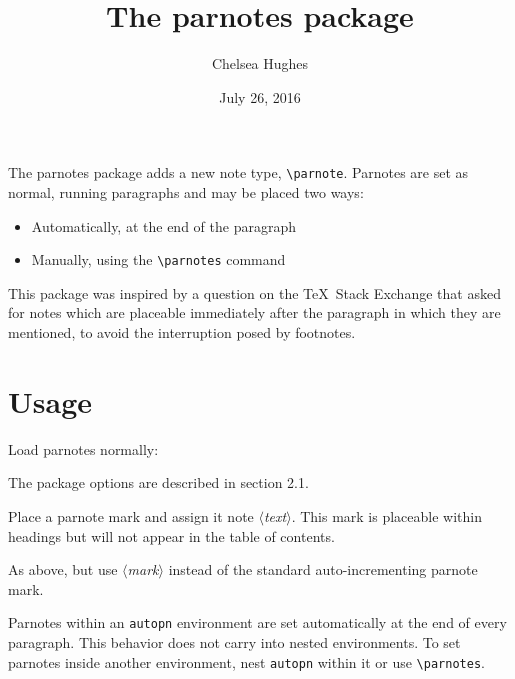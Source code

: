 \documentclass[10pt]{article}
\title{The \textsf{parnotes} package\parnote{This is rev.~2, last modified 7/26/2016.}}
\author{Chelsea Hughes\parnote{See \texttt{parnotes.sty} for copyright and contact details.}}
\date{July 26, 2016}
\begin{document}
\maketitle
\parnotes
The \textsf{parnotes} package adds a new note type, \verb+\parnote+. Parnotes are set as normal, running paragraphs and may be placed two ways:
\begin{itemize}
\item Automatically, at the end of the paragraph
\item Manually, using the \verb+\parnotes+ command
\end{itemize}
This package was inspired by a question on the \TeX\ Stack Exchange that asked for notes
which are placeable immediately after the paragraph in which they are mentioned, to avoid
the interruption posed by footnotes.

\parnotes
\bigskip
\section{Usage}
Load parnotes normally:

\medskip{}

\medskip\noindent The package options are described in section 2.1.

\medskip{}

\medskip\noindent Place a parnote mark and assign it note $\langle$\textit{text}$\rangle$. This mark is placeable within headings but will not appear in the table of contents.

\medskip{}

\medskip\noindent As above, but use $\langle$\textit{mark}$\rangle$ instead of the standard auto-incrementing parnote mark.

\medskip{}

\medskip\noindent Parnotes within an \texttt{autopn} environment are set automatically at the end of every paragraph. This behavior does not carry into nested environments. To set parnotes inside another environment, nest \texttt{autopn} within it or use \verb+\parnotes+.
\end{document}
